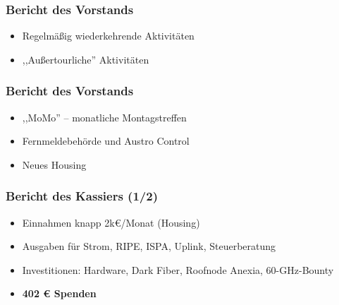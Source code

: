 \documentclass[17pt]{beamer} %
\begin{document}
\begin{frame}
	\frametitle{Bericht des Vorstands}
	\begin{itemize}
		\item Regelmäßig wiederkehrende Aktivitäten
		\item ,,Außertourliche'' Aktivitäten
	\end{itemize}
\end{frame}



\begin{frame}
	\frametitle{Bericht des Vorstands}
	\begin{itemize}
		\item ,,MoMo'' -- monatliche Montagstreffen
		\item Fernmeldebehörde und Austro Control
		\item Neues Housing
	\end{itemize}
\end{frame}



\begin{frame}
	\frametitle{Bericht des Kassiers (1/2)}
	\begin{itemize}
		\item Einnahmen knapp 2k€/Monat (Housing)
		\item Ausgaben für Strom, RIPE, ISPA, Uplink, Steuerberatung
		\item Investitionen: Hardware, Dark Fiber, Roofnode Anexia, 60-GHz-Bounty
		\item \textbf{402 € Spenden}
	\end{itemize}
\end{frame}
\end{document}
